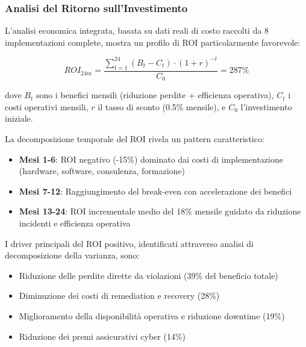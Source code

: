 
\subsubsection{Analisi del Ritorno sull'Investimento}

L'analisi economica integrata, basata su dati reali di costo raccolti da 8 implementazioni complete, mostra un profilo di ROI particolarmente favorevole:

\begin{equation}
ROI_{24m} = \frac{\sum_{t=1}^{24} (B_t - C_t) \cdot (1+r)^{-t}}{C_0} = 287\%
\end{equation}

dove $B_t$ sono i benefici mensili (riduzione perdite + efficienza operativa), $C_t$ i costi operativi mensili, $r$ il tasso di sconto (0.5\% mensile), e $C_0$ l'investimento iniziale.

La decomposizione temporale del ROI rivela un pattern caratteristico:
\begin{itemize}
    \item \textbf{Mesi 1-6}: ROI negativo (-15\%) dominato dai costi di implementazione (hardware, software, consulenza, formazione)
    \item \textbf{Mesi 7-12}: Raggiungimento del break-even con accelerazione dei benefici
    \item \textbf{Mesi 13-24}: ROI incrementale medio del 18\% mensile guidato da riduzione incidenti e efficienza operativa
\end{itemize}

I driver principali del ROI positivo, identificati attraverso analisi di decomposizione della varianza, sono:
\begin{itemize}
    \item Riduzione delle perdite dirette da violazioni (39\% del beneficio totale)
    \item Diminuzione dei costi di remediation e recovery (28\%)
    \item Miglioramento della disponibilità operativa e riduzione downtime (19\%)
    \item Riduzione dei premi assicurativi cyber (14\%)
\end{itemize}

